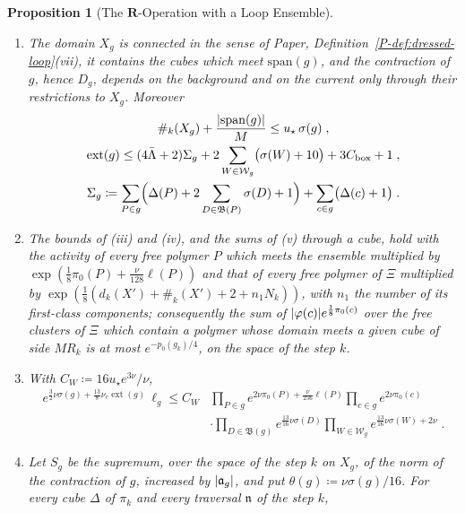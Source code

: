 \documentclass[11pt]{preprint}
\DeclarePairedDelimiter{\abs}{\lvert}{\rvert}
\numberwithin{equation}{section}
\newtheorem{proposition}{Proposition}
\theoremstyle{definition}
\theoremstyle{remark}
\theoremstyle{plain}
\begin{document}
\begin{proposition}[The $\mathbf R$-Operation with a Loop Ensemble]
\begin{enumerate}[label=(\roman*)]
\begin{enumerate}[label=(\alph*)]
\item The domain $X_g$ is connected in the sense of Paper, Definition~\ref{P-def:dressed-loop}(vii), it contains the cubes which meet $\mathrm{span}(g)$, and the contraction of $g$, hence $D_g$, depends on the background and on the current only through their restrictions to $X_g$. Moreover
\begin{equation}\label{eq:r-units}
\begin{gathered}
    \#_k(X_g) + \frac{\abs{\mathrm{span}(g)}}{M} \leq u_\star\,\sigma(g)\;,\\
    \operatorname{ext}(g) \leq (4\bar\Lambda + 2)\Sigma_g + 2\sum_{W \in \mathcal W_g}\bigl(\sigma(W) + 10\bigr) + 3C_{\mathrm{box}} + 1\;,\\
    \Sigma_g \coloneqq \sum_{P \in g}\Bigl(\Delta(P) + 2\sum_{D \in \mathfrak B(P)}\sigma(D) + 1\Bigr) + \sum_{c \in g}\bigl(\Delta(c) + 1\bigr)\;.
\end{gathered}
\end{equation}
\item The bounds of (iii) and (iv), and the sums of (v) through a cube, hold with the activity of every free polymer $P$ which meets the ensemble multiplied by $\exp(\frac18\pi_0(P) + \frac{\nu}{128}\ell(P))$ and that of every free polymer of $\Xi$ multiplied by $\exp(\frac18(d_k(X') + \#_k(X') + 2 + n_1N_k))$, with $n_1$ the number of its first-class components; consequently the sum of $\abs{\varphi(c)}e^{\frac18\pi_0(c)}$ over the free clusters of $\Xi$ which contain a polymer whose domain meets a given cube of side $MR_k$ is at most $e^{-p_0(g_k)/4}$, on the space of the step $k$.
\item With $C_W \coloneqq 16u_\star e^{3\nu}/\nu$,
\begin{equation}\label{eq:r-weight}
\begin{aligned}
    e^{\frac32\nu\sigma(g) + \frac{13}{8}\nu_e\operatorname{ext}(g)}\,\ell_g \leq C_W&\prod_{P \in g}e^{2\nu\pi_0(P) + \frac{\nu}{256}\ell(P)}\prod_{c \in g}e^{2\nu\pi_0(c)}\\
    &\cdot\prod_{D \in \mathfrak B(g)}e^{\frac{13}{16}\nu\sigma(D)}\prod_{W \in \mathcal W_g}e^{\frac{13}{16}\nu\sigma(W) + 2\nu}\;.
\end{aligned}
\end{equation}
\item Let $S_g$ be the supremum, over the space of the step $k$ on $X_g$, of the norm of the contraction of $g$, increased by $\abs{\mathfrak a_g}$, and put $\theta(g) \coloneqq \nu\sigma(g)/16$. For every cube $\Delta$ of $\pi_k$ and every traversal $\mathfrak n$ of the step $k$,

\end{enumerate}
\end{enumerate}
\end{proposition}
\end{document}
